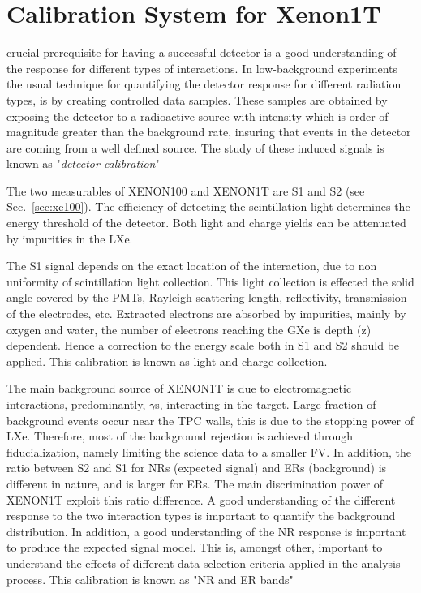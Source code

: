 %
%
\let\textcircled=\pgftextcircled

\chapter{Calibration System for Xenon1T} \label{chap:calib}
\label{chap:calibration}
 crucial prerequisite for having a successful detector is a good understanding of the response for different types of interactions. In low-background experiments the usual technique for quantifying the detector response for different radiation types, is by creating controlled data samples. These samples are obtained by exposing the detector to a radioactive source with intensity which is order of magnitude greater than the background rate, insuring that events in the detector are coming from a well defined source. The study of these induced signals is known as "\textit{detector calibration}" 

The two measurables of XENON100 and XENON1T are S1 and S2 (see Sec.~\ref{sec:xe100}). The efficiency of detecting the scintillation light determines the energy threshold of the detector. Both light and charge yields can be attenuated by impurities in the LXe. 

The S1 signal depends on the exact location of the interaction, due to non uniformity of scintillation light collection. This light collection is effected the solid angle covered by the PMTs, Rayleigh scattering length, reflectivity, transmission of the electrodes, etc. Extracted electrons are absorbed by impurities, mainly by oxygen and water, the number of electrons reaching the GXe is depth (z) dependent. Hence a correction to the energy scale both in S1 and S2 should be applied. This calibration is known as light and charge collection. 

The main background source of XENON1T is due to electromagnetic interactions, predominantly, $\gamma$s, interacting in the target. Large fraction of background events occur near the TPC walls, this is due to the stopping power of LXe. Therefore, most of the background rejection is achieved through fiducialization, namely limiting the science data to a smaller FV. In addition, the ratio between S2 and S1 for NRs (expected signal) and ERs (background) is different in nature, and is larger for ERs. The main discrimination power of XENON1T exploit this ratio difference. A good understanding of the different response to the two interaction types is important to quantify the background distribution. In addition, a good understanding of the NR response is important to produce the expected signal model. This is, amongst other, important to understand the effects of different data selection criteria applied in the analysis process. This calibration is known as "NR and ER bands"    

